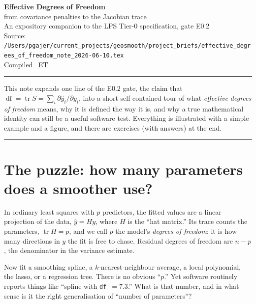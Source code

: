 \documentclass[11pt]{article}
\DeclareMathOperator{\tr}{tr}
\DeclareMathOperator{\df}{df}
\newcommand{\yhat}{\hat y}
\theoremstyle{definition}
\theoremstyle{plain}
\begin{document}
\begin{center}
{\LARGE\bfseries Effective Degrees of Freedom}\\[3pt]
{\large from covariance penalties to the Jacobian trace}\\[10pt]
{\small An expository companion to the LPS Tier-0 specification, gate E0.2}\\[8pt]
{\footnotesize Source: \nolinkurl{/Users/pgajer/current_projects/geosmooth/project_briefs/effective_degrees_of_freedom_note_2026-06-10.tex}}\\[2pt]
{\footnotesize Compiled \DTMnow\ ET}
\end{center}

\vspace{0.5em}
\hrule
\vspace{1em}

This note expands one line of the E0.2 gate, the claim that
$\df = \tr S = \sum_i \partial \yhat_i/\partial y_i$, into a short self-contained
tour of what \emph{effective degrees of freedom} means, why it is defined the way
it is, and why a true mathematical identity can still be a useful software test.
Everything is illustrated with a simple example and a figure, and there are
exercises (with answers) at the end.

\tableofcontents
\vspace{1em}
\hrule
\vspace{1em}

\section{The puzzle: how many parameters does a smoother use?}

In ordinary least squares with $p$ predictors, the fitted values are a linear
projection of the data, $\yhat = Hy$, where $H$ is the ``hat matrix.'' Its trace
counts the parameters, $\tr H = p$, and we call $p$ the model's
\emph{degrees of freedom}: it is how many directions in $y$ the fit is free to
chase. Residual degrees of freedom are $n-p$, the denominator in the variance
estimate.

Now fit a smoothing spline, a $k$-nearest-neighbour average, a local polynomial,
the lasso, or a regression tree. There is no obvious ``$p$.'' Yet software
routinely reports things like ``spline with \texttt{df}~$=7.3$.'' What is that
number, and in what sense is it the right generalisation of ``number of
parameters''?
\end{document}
